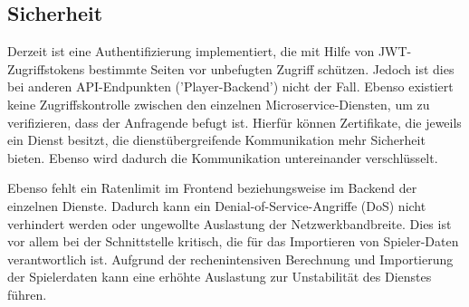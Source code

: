 \subsection{Sicherheit}

Derzeit ist eine Authentifizierung implementiert, die mit Hilfe von JWT-Zugriffstokens bestimmte Seiten vor unbefugten Zugriff schützen.
Jedoch ist dies bei anderen API-Endpunkten ('Player-Backend') nicht der Fall. Ebenso existiert keine Zugriffskontrolle zwischen den
einzelnen Microservice-Diensten, um zu verifizieren, dass der Anfragende befugt ist. Hierfür können Zertifikate, die jeweils ein
Dienst besitzt, die dienstübergreifende Kommunikation mehr Sicherheit bieten. Ebenso wird dadurch die Kommunikation untereinander
verschlüsselt.

Ebenso fehlt ein Ratenlimit im Frontend beziehungsweise im Backend der einzelnen Dienste. Dadurch kann ein Denial-of-Service-Angriffe (DoS)
nicht verhindert werden oder ungewollte Auslastung der Netzwerkbandbreite. Dies ist vor allem bei der Schnittstelle kritisch, die für das 
Importieren von Spieler-Daten verantwortlich ist. Aufgrund der rechenintensiven Berechnung und Importierung der Spielerdaten kann 
eine erhöhte Auslastung zur Unstabilität des Dienstes führen.